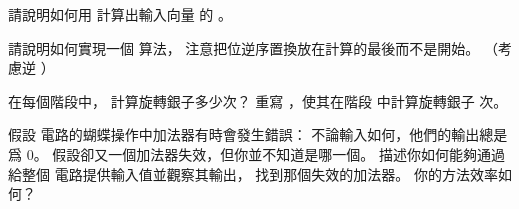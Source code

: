 \startsection[
  title={Efficient FFT implementations},
]

\startEXERCISE
請說明如何用  計算出輸入向量  的 。
\stopEXERCISE

\startANSWER
{}
\stopANSWER

\startEXERCISE
請說明如何實現一個  算法，
注意把位逆序置換放在計算的最後而不是開始。
（\hint 考慮逆 ）
\stopEXERCISE

\startANSWER
{}
\stopANSWER

\startEXERCISE
在每個階段中，  計算旋轉銀子多少次？
重寫 ，使其在階段  中計算旋轉銀子  次。
\stopEXERCISE

\startANSWER
{}
\stopANSWER

\startEXERCISE\DIFFICULT
假設  電路的蝴蝶操作中加法器有時會發生錯誤：
不論輸入如何，他們的輸出總是爲 0。
假設卻又一個加法器失效，但你並不知道是哪一個。
描述你如何能夠通過給整個  電路提供輸入值並觀察其輸出，
找到那個失效的加法器。
你的方法效率如何？
\stopEXERCISE

\startANSWER
{}
\stopANSWER

\stopsection

